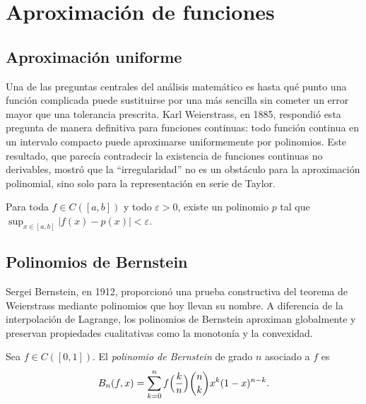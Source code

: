 \chapter{Aproximación de funciones}
\label{ch:aproximacion}

\section{Aproximación uniforme}

Una de las preguntas centrales del análisis matemático es hasta qué punto una función complicada puede sustituirse por una más sencilla sin cometer un error mayor que una tolerancia prescrita. Karl Weierstrass, en 1885, respondió esta pregunta de manera definitiva para funciones continuas: todo función continua en un intervalo compacto puede aproximarse uniformemente por polinomios. Este resultado, que parecía contradecir la existencia de funciones continuas no derivables, mostró que la ``irregularidad'' no es un obstáculo para la aproximación polinomial, sino solo para la representación en serie de Taylor.

\begin{theorem}[Weierstrass]
\label{teo:weierstrass-aprox}
Para toda $f\in C([a,b])$ y todo $\varepsilon>0$, existe un polinomio $p$ tal que $\sup_{x\in[a,b]}|f(x)-p(x)|<\varepsilon$.
\end{theorem}

\section{Polinomios de Bernstein}

Sergei Bernstein, en 1912, proporcionó una prueba constructiva del teorema de Weierstrass mediante polinomios que hoy llevan su nombre. A diferencia de la interpolación de Lagrange, los polinomios de Bernstein aproximan globalmente y preservan propiedades cualitativas como la monotonía y la convexidad.

\begin{definition}
\label{def:bernstein}
Sea $f\in C([0,1])$. El \emph{polinomio de Bernstein} de grado $n$ asociado a $f$ es
\[
  B_n(f,x)=\sum_{k=0}^{n}f\Bigl(\frac{k}{n}\Bigr)\binom{n}{k}x^k(1-x)^{n-k}.
\]
\end{definition}

